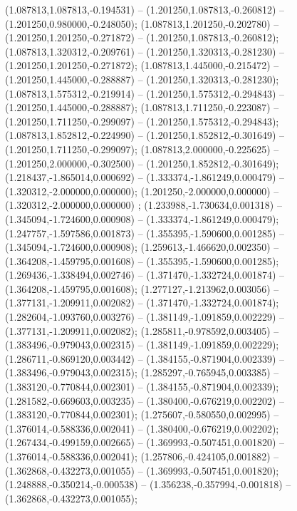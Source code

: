  (1.087813,1.087813,-0.194531) -- (1.201250,1.087813,-0.260812) -- (1.201250,0.980000,-0.248050);
 (1.087813,1.201250,-0.202780) -- (1.201250,1.201250,-0.271872) -- (1.201250,1.087813,-0.260812);
 (1.087813,1.320312,-0.209761) -- (1.201250,1.320313,-0.281230) -- (1.201250,1.201250,-0.271872);
 (1.087813,1.445000,-0.215472) -- (1.201250,1.445000,-0.288887) -- (1.201250,1.320313,-0.281230);
 (1.087813,1.575312,-0.219914) -- (1.201250,1.575312,-0.294843) -- (1.201250,1.445000,-0.288887);
 (1.087813,1.711250,-0.223087) -- (1.201250,1.711250,-0.299097) -- (1.201250,1.575312,-0.294843);
 (1.087813,1.852812,-0.224990) -- (1.201250,1.852812,-0.301649) -- (1.201250,1.711250,-0.299097);
 (1.087813,2.000000,-0.225625) -- (1.201250,2.000000,-0.302500) -- (1.201250,1.852812,-0.301649);
 (1.218437,-1.865014,0.000692) -- (1.333374,-1.861249,0.000479) -- (1.320312,-2.000000,0.000000);
 (1.201250,-2.000000,0.000000) -- (1.320312,-2.000000,0.000000) ;
 (1.233988,-1.730634,0.001318) -- (1.345094,-1.724600,0.000908) -- (1.333374,-1.861249,0.000479);
 (1.247757,-1.597586,0.001873) -- (1.355395,-1.590600,0.001285) -- (1.345094,-1.724600,0.000908);
 (1.259613,-1.466620,0.002350) -- (1.364208,-1.459795,0.001608) -- (1.355395,-1.590600,0.001285);
 (1.269436,-1.338494,0.002746) -- (1.371470,-1.332724,0.001874) -- (1.364208,-1.459795,0.001608);
 (1.277127,-1.213962,0.003056) -- (1.377131,-1.209911,0.002082) -- (1.371470,-1.332724,0.001874);
 (1.282604,-1.093760,0.003276) -- (1.381149,-1.091859,0.002229) -- (1.377131,-1.209911,0.002082);
 (1.285811,-0.978592,0.003405) -- (1.383496,-0.979043,0.002315) -- (1.381149,-1.091859,0.002229);
 (1.286711,-0.869120,0.003442) -- (1.384155,-0.871904,0.002339) -- (1.383496,-0.979043,0.002315);
 (1.285297,-0.765945,0.003385) -- (1.383120,-0.770844,0.002301) -- (1.384155,-0.871904,0.002339);
 (1.281582,-0.669603,0.003235) -- (1.380400,-0.676219,0.002202) -- (1.383120,-0.770844,0.002301);
 (1.275607,-0.580550,0.002995) -- (1.376014,-0.588336,0.002041) -- (1.380400,-0.676219,0.002202);
 (1.267434,-0.499159,0.002665) -- (1.369993,-0.507451,0.001820) -- (1.376014,-0.588336,0.002041);
 (1.257806,-0.424105,0.001882) -- (1.362868,-0.432273,0.001055) -- (1.369993,-0.507451,0.001820);
 (1.248888,-0.350214,-0.000538) -- (1.356238,-0.357994,-0.001818) -- (1.362868,-0.432273,0.001055);
